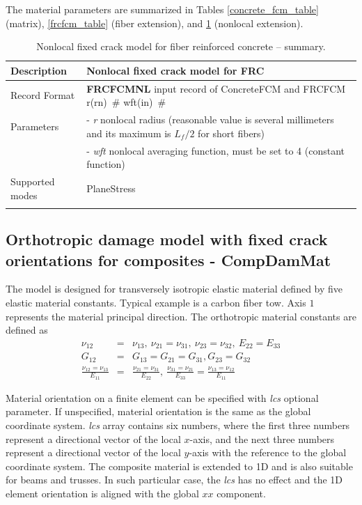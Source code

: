\documentclass[a4paper]{article}
\newcommand{\descitem}[1]{{\noindent \bf #1}}
\newcommand{\elemparam}[2]{{{#1\tiny (#2)}~\#}}
\newcommand{\param}[1]{{\it #1}}
\begin{document}
The material parameters are summarized in Tables \ref{concrete_fcm_table} (matrix), \ref{frcfcm_table} (fiber extension), and \ref{frcfcmnl_table} (nonlocal extension).

\begin{longtable}{|l|p{9cm}|}
\hline
Description & Nonlocal fixed crack model for FRC\\
\hline
Record Format & \descitem{FRCFCMNL} input record of ConcreteFCM and FRCFCM
\elemparam{r}{rn}
\elemparam{wft}{in}
\\
Parameters &- \param{r} nonlocal radius (reasonable value is several millimeters and its maximum is $L_f/2$ for short fibers)\\
&- \param{wft} nonlocal averaging function, must be set to 4 (constant function)\\
Supported modes& PlaneStress\\
\hline
\caption{Nonlocal fixed crack model for fiber reinforced concrete -- summary.}
\label{frcfcmnl_table}
\end{longtable}


\subsection{Orthotropic damage model with fixed crack orientations for composites - CompDamMat}

The model is designed for transversely isotropic elastic material defined by five elastic material constants. Typical example is a carbon fiber tow. Axis $1$ represents the material principal direction. The orthotropic material constants are defined as
\begin{eqnarray}
\nu_{12}&=&\nu_{13},~\nu_{21}=\nu_{31},~\nu_{23}=\nu_{32},~E_{22}=E_{33}\\
G_{12}&=&G_{13}=G_{21}=G_{31},G_{23}=G_{32}\\
\frac{\nu_{12}=\nu_{13}}{E_{11}} &=& \frac{\nu_{21}=\nu_{31}}{E_{22}},~\frac{\nu_{31}=\nu_{21}}{E_{33}} = \frac{\nu_{13}=\nu_{12}}{E_{11}}
\end{eqnarray}

Material orientation on a finite element can be specified with \param{lcs} optional parameter. If unspecified, material orientation is the same as the global coordinate system. \param{lcs} array contains six numbers,
where the first three numbers represent a directional vector of the local $x$-axis, and the next three numbers represent a directional vector of the local $y$-axis with the reference to the global coordinate system. The composite material is extended to 1D and is also suitable for beams and trusses. In such particular case, the \param{lcs} has no effect and the 1D element orientation is aligned with the global $xx$ component.
\end{document}
